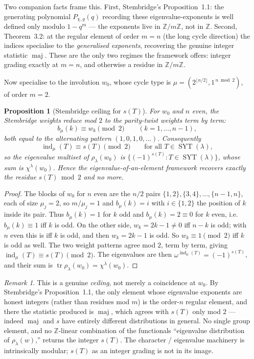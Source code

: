 \documentclass{article}
\newtheorem{proposition}{Proposition}
\theoremstyle{definition}
\theoremstyle{remark}
\newtheorem{remark}{Remark}
\newcommand{\SYT}{\operatorname{SYT}}
\newcommand{\maj}{\operatorname{maj}}
\newcommand{\ind}{\operatorname{ind}}
\newcommand{\Z}{\mathbb{Z}}
\begin{document}
Two companion facts frame this. First, Stembridge's Proposition~1.1: the
generating polynomial $P_{\chi,g}(q)$ recording these eigenvalue-exponents is
well defined only modulo $1 - q^m$ --- the exponents live in $\Z/m\Z$, not in
$\Z$. Second, Theorem~3.2: at the regular element of order $m = n$ (the long
cycle direction) the indices specialise to the \emph{generalised exponents},
recovering the genuine integer statistic $\maj$. These are the only two regimes
the framework offers: integer grading exactly at $m=n$, and otherwise a residue
in $\Z/m\Z$.

Now specialise to the involution $w_0$, whose cycle type is
$\mu = (2^{\lfloor n/2 \rfloor}, 1^{\,n \bmod 2})$, of order $m = 2$.

\begin{proposition}[Stembridge ceiling for $s(T)$]\label{prop:ceiling}
For $w_0$ and $n$ even, the Stembridge weights reduce mod $2$ to the
parity-twist weights term by term:
\[
b_\mu(k) \equiv w_k \pmod 2 \qquad (k = 1,\dots,n-1),
\]
both equal to the alternating pattern $(1,0,1,0,\dots)$. Consequently
\[
\ind_\mu(T) \equiv s(T) \pmod 2 \qquad \text{for all } T \in \SYT(\lambda),
\]
so the eigenvalue multiset of $\rho_\lambda(w_0)$ is
$\{(-1)^{s(T)} : T \in \SYT(\lambda)\}$, whose sum is $\chi^\lambda(w_0)$. Hence
the eigenvalue-of-an-element framework recovers exactly the residue
$s(T) \bmod 2$ and no more.
\end{proposition}

\begin{proof}
The blocks of $w_0$ for $n$ even are the $n/2$ pairs
$\{1,2\},\{3,4\},\dots,\{n-1,n\}$, each of size $\mu_j = 2$, so $m/\mu_j = 1$ and
$b_\mu(k) = i$ with $i \in \{1,2\}$ the position of $k$ inside its pair. Thus
$b_\mu(k) = 1$ for $k$ odd and $b_\mu(k) = 2 \equiv 0$ for $k$ even, i.e.\
$b_\mu(k) \equiv 1$ iff $k$ is odd. On the other side, $w_k = 2k-1 \neq 0$ iff
$n-k$ is odd; with $n$ even this is iff $k$ is odd, and then $w_k = 2k-1$ is odd.
So $w_k \equiv 1 \pmod 2$ iff $k$ is odd as well. The two weight patterns agree
mod $2$, term by term, giving $\ind_\mu(T) \equiv s(T) \pmod 2$. The eigenvalues
are then $\omega^{\ind_\mu(T)} = (-1)^{s(T)}$, and their sum is
$\operatorname{tr}\rho_\lambda(w_0) = \chi^\lambda(w_0)$.
\end{proof}

\begin{remark}
This is a genuine \emph{ceiling}, not merely a coincidence at $w_0$. By
Stembridge's Proposition~1.1, the only element whose eigenvalue exponents are
honest integers (rather than residues mod $m$) is the order-$n$ regular element,
and there the statistic produced is $\maj$, which agrees with $s(T)$ only mod $2$
--- indeed $\maj$ and $s$ have entirely different distributions in general. No
single group element, and no $\Z$-linear combination of the functionals
``eigenvalue distribution of $\rho_\lambda(w)$,'' returns the integer $s(T)$.
The character / eigenvalue machinery is intrinsically modular; $s(T)$ as an
integer grading is not in its image.
\end{remark}
\end{document}
